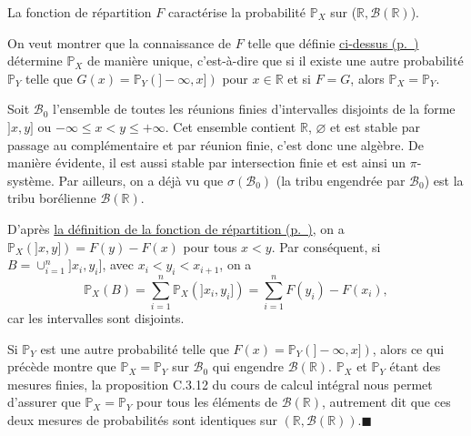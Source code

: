 \begin{theoreme}\label{I-carac}

La fonction de répartition \(F\) caractérise la probabilité
\(\mathbb{P}_X\) sur (\(\mathbb{R},\mathcal{B}(\mathbb{R})\)).
\end{theoreme}

\begin{preuve}
On veut montrer que la connaissance de \(F\) telle que définie
\protect\hyperref[I-deffdr]{ci-dessus (p.~\pageref*{I-deffdr})}
détermine \(\mathbb{P}_X\) de manière unique, c'est-à-dire que si il
existe une autre probabilité \(\mathbb{P}_Y\) telle que
\(G(x) = \mathbb{P}_Y(]-\infty,x])\) pour \(x \in \mathbb{R}\) et si
\(F = G\), alors \(\mathbb{P}_X = \mathbb{P}_Y\).

Soit \(\mathcal{B}_0\) l'ensemble de toutes les réunions finies
d'intervalles disjoints de la forme \(]x,y]\) ou
\(-\infty \leq x < y \leq +\infty\). Cet ensemble contient
\(\mathbb{R}\), \(\varnothing\) et est stable par passage au
complémentaire et par réunion finie, c'est donc une algèbre. De manière
évidente, il est aussi stable par intersection finie et est ainsi un
\(\pi\)-système. Par ailleurs, on a déjà vu que
\(\sigma(\mathcal{B}_0)\) (la tribu engendrée par \(\mathcal{B}_0\)) est
la tribu borélienne \(\mathcal{B}(\mathbb{R})\).

D'après \protect\hyperref[I-deffdr]{la définition de la fonction de
répartition (p.~\pageref*{I-deffdr})}, on a
\(\mathbb{P}_X(]x,y]) = F(y)-F(x)\) pour tous \(x< y\). Par conséquent,
si \(B = \cup_{i=1}^n ]x_i,y_i]\), avec \(x_i < y_i < x_{i+1}\), on a
\[\mathbb{P}_X(B) = \sum_{i=1}^n \mathbb{P}_X(]x_i,y_i]) = \sum_{i=1}^n F(y_i)-F(x_i),\]
car les intervalles sont disjoints.

Si \(\mathbb{P}_Y\) est une autre probabilité telle que
\(F(x) = \mathbb{P}_Y(]-\infty,x])\), alors ce qui précède montre que
\(\mathbb{P}_X = \mathbb{P}_Y\) sur \(\mathcal{B}_0\) qui engendre
\(\mathcal{B}(\mathbb{R})\). \(\mathbb{P}_X\) et \(\mathbb{P}_Y\) étant
des mesures finies, la proposition C.3.12 du cours de calcul intégral
nous permet d'assurer que \(\mathbb{P}_X = \mathbb{P}_Y\) pour tous les
éléments de \(\mathcal{B}(\mathbb{R})\), autrement dit que ces deux
mesures de probabilités sont identiques sur
\((\mathbb{R},\mathcal{B}(\mathbb{R}))\).\hfill$\blacksquare$
\end{preuve}

